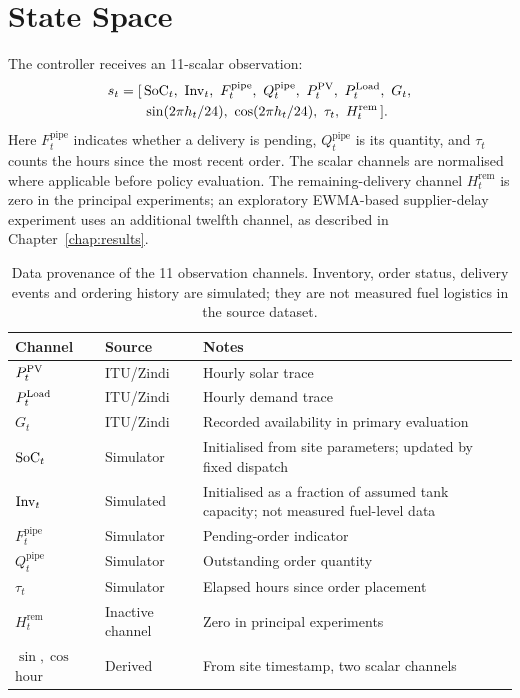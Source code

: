 \section{State Space}
\label{sec:state}

\begin{revisedblock}
The controller receives an 11-scalar observation:
\begin{equation}
\begin{aligned}
s_t = [\,&\SoC_t,\ \Inv_t,\ F_t^{\mathrm{pipe}},\ Q_t^{\mathrm{pipe}},
\ P_t^{\PV},\ P_t^{\Load},\ G_t,\\
&\sin(2\pi h_t/24),\ \cos(2\pi h_t/24),\
\tau_t,\ H_t^{\mathrm{rem}}\,].
\end{aligned}
\label{eq:state}
\end{equation}
Here $F_t^{\mathrm{pipe}}$ indicates whether a delivery is pending,
$Q_t^{\mathrm{pipe}}$ is its quantity, and $\tau_t$ counts the hours
since the most recent order. The scalar channels are normalised
where applicable before policy evaluation. The remaining-delivery
channel $H_t^{\mathrm{rem}}$ is zero in the principal experiments;
an exploratory EWMA-based supplier-delay experiment uses an additional
twelfth channel, as described in Chapter~\ref{chap:results}.
\end{revisedblock}

\begin{table}[htbp]
\centering
\small
\ifshowrevisions\color{P3Rcolor}\fi
\begin{tabularx}{\textwidth}{p{2.3cm}p{3.0cm}X}
\toprule
\textbf{Channel} & \textbf{Source} & \textbf{Notes} \\
\midrule
$P_t^{\mathrm{PV}}$ & ITU/Zindi & Hourly solar trace \\
$P_t^{\mathrm{Load}}$ & ITU/Zindi & Hourly demand trace \\
$G_t$ & ITU/Zindi & Recorded availability in primary evaluation \\
$\mathrm{SoC}_t$ & Simulator & Initialised from site parameters; updated by fixed dispatch \\
$\mathrm{Inv}_t$ & Simulated & Initialised as a fraction of assumed tank capacity; not measured fuel-level data \\
$F_t^{\mathrm{pipe}}$ & Simulator & Pending-order indicator \\
$Q_t^{\mathrm{pipe}}$ & Simulator & Outstanding order quantity \\
$\tau_t$ & Simulator & Elapsed hours since order placement \\
$H_t^{\mathrm{rem}}$ & Inactive channel & Zero in principal experiments \\
$\sin,\cos$ hour & Derived & From site timestamp, two scalar channels \\
\bottomrule
\end{tabularx}
\caption{Data provenance of the 11 observation channels. Inventory,
order status, delivery events and ordering history are simulated;
they are not measured fuel logistics in the source dataset.}
\label{tab:state_sources}
\end{table}

